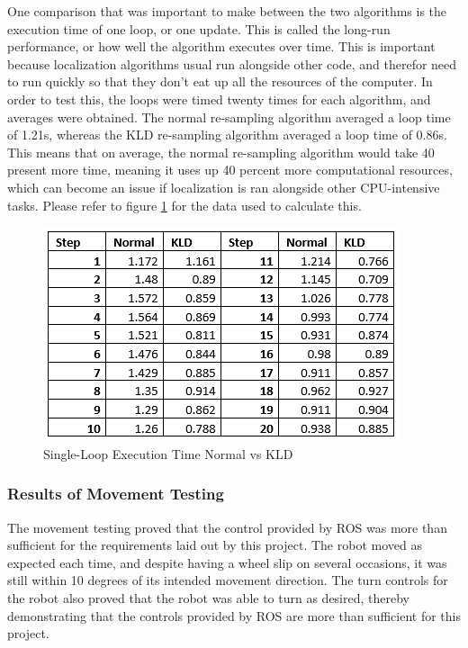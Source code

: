 \documentclass{article}
\newcommand\tab[1][0.5cm]{\hspace*{#1}}
\begin{document}
One comparison that was important to make between the two algorithms is the execution time of one loop, or one update. This is called the long-run performance, or how well the algorithm executes over time. This is important because localization algorithms usual run alongside other code, and therefor need to run quickly so that they don't eat up all the resources of the computer. In order to test this, the loops were timed twenty times for each algorithm, and averages were obtained. The normal re-sampling algorithm averaged a loop time of 1.21s, whereas the KLD re-sampling algorithm averaged a loop time of 0.86s. This means that on average, the normal re-sampling algorithm would take 40 present more time, meaning it uses up 40 percent more computational resources, which can become an issue if localization is ran alongside other CPU-intensive tasks. Please refer to figure \ref{fig:long-term} for the data used to calculate this.\\

\begin{figure}[h!]
\centering
\includegraphics[scale=1.0]{long-run.PNG}
\caption{Single-Loop Execution Time Normal vs KLD}
\label{fig:long-term}
\end{figure}

\subsubsection{Results of Movement Testing}
\tab The movement testing proved that the control provided by ROS was more than sufficient for the requirements laid out by this project. The robot moved as expected each time, and despite having a wheel slip on several occasions, it was still within 10 degrees of its intended movement direction. The turn controls for the robot also proved that the robot was able to turn as desired, thereby demonstrating that the controls provided by ROS are more than sufficient for this project.
\end{document}
